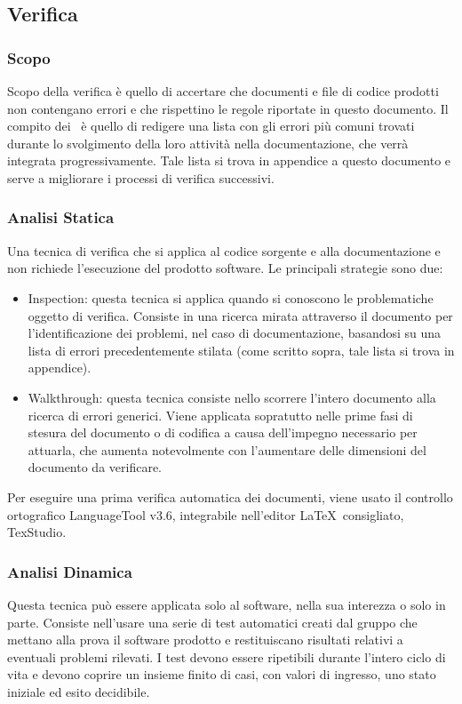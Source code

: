 \documentclass[../NormeDiProgetto.tex]{subfiles}
\begin{document}
		\subsection{Verifica}
			\subsubsection{Scopo}
				Scopo della verifica è quello di accertare che documenti e file di codice prodotti non
				contengano errori e che rispettino le regole riportate in questo documento.
				Il compito dei \verificatori\ è quello di redigere una lista con gli errori più comuni trovati
				durante lo svolgimento della loro attività nella documentazione, che verrà integrata
				progressivamente. Tale lista si trova in appendice a questo documento e serve a
				migliorare i processi di verifica successivi.
				\subsubsection{Analisi Statica}
				Una tecnica di verifica che si applica al codice sorgente e alla documentazione
				e non richiede l'esecuzione del prodotto software.
				Le principali strategie sono due:
				\begin{itemize}
					\item Inspection: questa tecnica si applica quando si conoscono le
					problematiche oggetto di verifica. Consiste in una ricerca mirata attraverso il
					documento per l'identificazione dei problemi, nel caso di documentazione,
					basandosi su una lista di errori precedentemente stilata
					(come scritto sopra, tale lista si trova in appendice).
					\item Walkthrough: questa tecnica consiste nello scorrere l'intero
					documento alla ricerca di errori generici. Viene applicata sopratutto nelle
					prime fasi di stesura del documento o di codifica a causa dell'impegno
					necessario per attuarla, che aumenta notevolmente con l'aumentare delle
					dimensioni del documento da verificare.
				\end{itemize}
				Per eseguire una prima verifica automatica dei documenti, viene usato il controllo
				ortografico	LanguageTool v3.6, integrabile nell'editor \LaTeX\ consigliato, TexStudio.
				\subsubsection{Analisi Dinamica}
				Questa tecnica può essere applicata solo al software, nella sua interezza o solo
				in parte.
				Consiste nell'usare una serie di test automatici creati dal gruppo che mettano
				alla prova il software prodotto e restituiscano risultati relativi a eventuali
				problemi rilevati.
				I test devono essere ripetibili durante l'intero ciclo di vita e devono coprire
				un insieme finito di casi, con valori di ingresso, uno stato iniziale ed esito
				decidibile.
\end{document}
